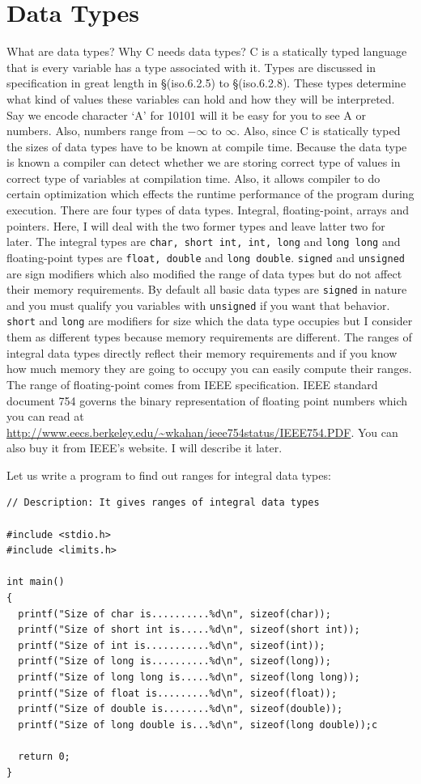 \section{Data Types}
What are data types? Why C needs data types? C is a statically typed language
that is every variable has a type associated with it. Types are discussed in
specification in great length in \S(iso.6.2.5) to \S(iso.6.2.8).
These types determine
what kind of values these variables can hold and how they will be interpreted.
Say we encode
character `A' for 10101 will it be easy for you to see A or numbers. Also,
numbers range from $-\infty$ to $\infty$. Also, since C is statically typed the
sizes of data types have to be known at compile time. Because the data type is
known a compiler can detect whether we are storing correct type of values in
correct type of variables at compilation time. Also, it allows compiler to do
certain optimization which effects the runtime performance of the program
during execution. There are four types of
data types. Integral, floating-point, arrays and pointers. Here, I will deal
with the two former types and leave latter two for later. The integral types
are \texttt{char, short int, int, long} and \texttt{long long} and
floating-point types are \texttt{float, double} and \texttt{long
  double}. \texttt{signed} and \texttt{unsigned} are sign modifiers which also
modified the range of data types but do not affect their memory
requirements. By default all basic data types are \texttt{signed} in nature and
you must qualify you variables with \texttt{unsigned} if you want that
behavior. \texttt{short} and \texttt{long} are modifiers for size which the
data type occupies but I consider them as different types because memory
requirements are different. The ranges of integral data types directly reflect
their memory requirements and if you know how much memory they are going to
occupy you can easily compute their ranges. The range of floating-point comes
from IEEE specification. IEEE standard document 754 governs the binary
representation of floating point numbers which you can read at
\url{http://www.eecs.berkeley.edu/~wkahan/ieee754status/IEEE754.PDF}. You can
also buy it from IEEE's website. I will describe it later.

Let us write a program to find out ranges for integral data types:

\begin{Verbatim}[frame=single]
// Description: It gives ranges of integral data types

#include <stdio.h>
#include <limits.h>

int main()
{
  printf("Size of char is..........%d\n", sizeof(char));
  printf("Size of short int is.....%d\n", sizeof(short int));
  printf("Size of int is...........%d\n", sizeof(int));
  printf("Size of long is..........%d\n", sizeof(long));
  printf("Size of long long is.....%d\n", sizeof(long long));
  printf("Size of float is.........%d\n", sizeof(float));
  printf("Size of double is........%d\n", sizeof(double));
  printf("Size of long double is...%d\n", sizeof(long double));c

  return 0;
}
\end{Verbatim}

